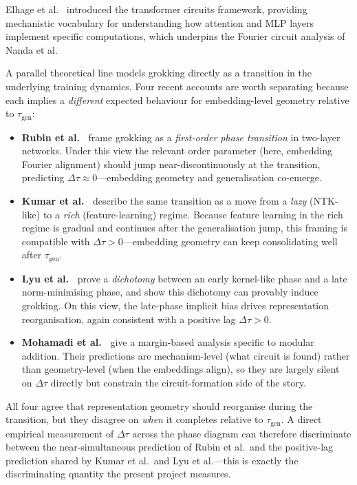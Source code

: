 \documentclass[12pt,openany,oneside,a4paper]{book}
\newcommand{\taug}{\tau_{\mathrm{gen}}}
\newcommand{\Dtau}{\Delta\tau}
\begin{document}
Elhage et al.\ \cite{elhage2021mathematical} introduced the
transformer circuits framework, providing mechanistic vocabulary
for understanding how attention and MLP layers implement specific
computations, which underpins the Fourier circuit analysis of
Nanda et al.

A parallel theoretical line models grokking directly as a transition
in the underlying training dynamics.
Four recent accounts are worth separating because each implies a
\emph{different} expected behaviour for embedding-level geometry
relative to $\taug$:

\begin{itemize}
  \item \textbf{Rubin et al.\ \cite{rubin2024grokking}} frame grokking
    as a \emph{first-order phase transition} in two-layer networks.
    Under this view the relevant order parameter (here, embedding
    Fourier alignment) should jump near-discontinuously at the
    transition, predicting $\Dtau\approx 0$---embedding geometry and
    generalisation co-emerge.
  \item \textbf{Kumar et al.\ \cite{kumar2024lazy}} describe the same
    transition as a move from a \emph{lazy} (NTK-like) to a
    \emph{rich} (feature-learning) regime.
    Because feature learning in the rich regime is gradual and
    continues after the generalisation jump, this framing is
    compatible with $\Dtau > 0$---embedding geometry can keep
    consolidating well after $\taug$.
  \item \textbf{Lyu et al.\ \cite{lyu2024dichotomy}} prove a
    \emph{dichotomy} between an early kernel-like phase and a late
    norm-minimising phase, and show this dichotomy can provably
    induce grokking.
    On this view, the late-phase implicit bias drives representation
    reorganisation, again consistent with a positive lag
    $\Dtau > 0$.
  \item \textbf{Mohamadi et al.\ \cite{mohamadi2024grok}} give a
    margin-based analysis specific to modular addition.
    Their predictions are mechanism-level (what circuit is found)
    rather than geometry-level (when the embeddings align), so they
    are largely silent on $\Dtau$ directly but constrain the
    circuit-formation side of the story.
\end{itemize}

All four agree that representation geometry should reorganise during
the transition, but they disagree on \emph{when} it completes
relative to $\taug$.
A direct empirical measurement of $\Dtau$ across the phase diagram
can therefore discriminate between the near-simultaneous prediction
of Rubin et al.\ and the positive-lag prediction shared by Kumar et
al.\ and Lyu et al.---this is exactly the discriminating quantity
the present project measures.
\end{document}

